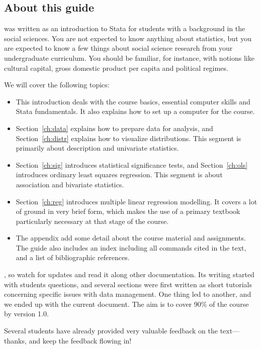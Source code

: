 %
\subsection{About this guide}%
	 was written as an introduction to Stata for students with a background in the social sciences. You are not expected to know anything about statistics, but you are expected to know a few things about social science research from your undergraduate curriculum. You should be familiar, for instance, with notions like cultural capital, gross domestic product per capita and political regimes.%

	We will cover the following topics:%

	\begin{itemize}
		\item This introduction deals with the course basics, essential computer skills and Stata fundamentals. It also explains how to set up a computer for the course.%
	
		\item %
		Section~\ref{ch:data} explains how to prepare data for analysis, and %
		Section~\ref{ch:distr} explains how to visualize distributions. This segment is primarily about description and univariate statistics.%
	
		\item %
		Section~\ref{ch:sig} introduces statistical significance tests, and %
		Section~\ref{ch:ols} introduces ordinary least squares regression. This segment is about association and bivariate statistics.%

		\item %
		Section~\ref{ch:reg} 
		introduces multiple linear regression modelling. %
		It covers a lot of ground in very brief form, which makes the use of a primary textbook particularly necessary at that stage of the course.%

		\item %
		The appendix add some detail about the course material and assignments. The guide also includes an index including all commands cited in the text, and a list of bibliographic references.%
	\end{itemize}

, so watch for updates and read it along other documentation. Its writing started with students questions, and several sections were first written as short tutorials concerning specific issues with data management. One thing led to another, and we ended up with the current document. The aim is to cover 90\% of the course by version 1.0.%

	Several students have already provided very valuable feedback on the text—thanks, and keep the feedback flowing in!%